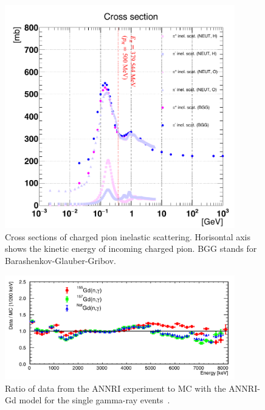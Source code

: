 \begin{figure}[tbp]
	\centering
	\includegraphics[width=10cm]{Figures/Simulation/XS_piinel}
	\caption[Cross sections of charged pion inelastic scattering]{
	Cross sections of charged pion inelastic scattering.
	Horisontal axis shows the kinetic energy of incoming charged pion.
	BGG stands for Barashenkov-Glauber-Gribov.
	}\label{XS_piinel}
\end{figure}

\begin{figure}[tbp]
	\centering
	\includegraphics[width=10cm]{Figures/Simulation/RatioGdGam}
	\caption[Ratio of data from the ANNRI experiment by MC with the ANNRI-Gd model for the single gamma-ray events]{
	Ratio of data from the ANNRI experiment to MC with the ANNRI-Gd model for the single gamma-ray events~\cite{2020Tanaka}.
	}\label{Simula_RatioGdGam}
\end{figure}





\newpage

